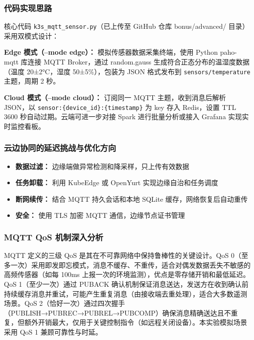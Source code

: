\documentclass[12pt,a4paper]{ctexart}
\begin{document}
\subsubsection{代码实现思路}

核心代码 \texttt{k3s\_mqtt\_sensor.py}（已上传至 GitHub 仓库 bonus/advanced/ 目录）采用双模式设计：

\textbf{Edge 模式（--mode edge）：}
模拟传感器数据采集终端，使用 Python paho-mqtt 库连接 MQTT Broker，通过 random.gauss 生成符合正态分布的温湿度数据（温度 20±2°C，湿度 50±5\%），包装为 JSON 格式发布到 \texttt{sensors/temperature} 主题，周期 2 秒。

\textbf{Cloud 模式（--mode cloud）：}
订阅同一 MQTT 主题，收到消息后解析 JSON，以 \texttt{sensor:\{device\_id\}:\{timestamp\}} 为 key 存入 Redis，设置 TTL 3600 秒自动过期。云端可进一步对接 Spark 进行批量分析或接入 Grafana 实现实时监控看板。

\subsubsection{云边协同的延迟挑战与优化方向}

\begin{itemize}
  \item \textbf{数据过滤：} 边缘端做异常检测和降采样，只上传有效数据
  \item \textbf{任务卸载：} 利用 KubeEdge 或 OpenYurt 实现边缘自治和任务调度
  \item \textbf{断网续传：} 结合 MQTT 持久会话和本地 SQLite 缓存，网络恢复后自动重传
  \item \textbf{安全：} 使用 TLS 加密 MQTT 通信，边缘节点证书管理
\end{itemize}

\subsubsection{MQTT QoS 机制深入分析}

MQTT 定义的三级 QoS 是其在不可靠网络中保持鲁棒性的关键设计。QoS 0（至多一次）采用即发即忘模式，消息不缓存、不重传，适合对偶发数据丢失不敏感的高频传感器（如每 100ms 上报一次的环境监测），优点是零存储开销和最低延迟。QoS 1（至少一次）通过 PUBACK 确认机制保证消息送达，发送方在收到确认前持续缓存消息并重试，可能产生重复消息（由接收端去重处理），适合大多数遥测场景。QoS 2（恰好一次）通过四次握手（PUBLISH→PUBREC→PUBREL→PUBCOMP）确保消息精确送达且不重复，但额外开销最大，仅用于关键控制指令（如远程关闭设备）。本实验模拟场景采用 QoS 1 兼顾可靠性与时延。
\end{document}
